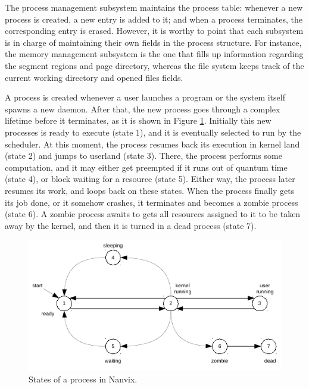 	The process management subsystem maintains the process table:
	whenever a new process is created, a new entry is added to it; and
	when a process terminates, the corresponding entry is erased.
	However, it is worthy to point that each subsystem is in charge of
	maintaining their own fields in the process structure.  For
	instance, the memory management subsystem is the one that fills up
	information regarding the segment regions and page directory,
	whereas the file system keeps track of the current working directory
	and opened files fields.

	A process is created whenever a user launches a program or the
	system itself spawns a new daemon. After that, the new process goes
	through a complex lifetime before it terminates, as it is shown in
	Figure \ref{figure: states of a process in nanvix}.  Initially this
	new processes is ready to execute (state 1), and it is eventually
	selected to run by the scheduler. At this moment, the process
	resumes back its execution in kernel land (state 2) and jumps to
	userland (state 3). There, the process performs some computation,
	and it may either get preempted if it runs out of quantum time
	(state 4), or block waiting for a resource (state 5). Either way,
	the process later resumes its work, and loops back on these states.
	When the process finally gets its job done, or it somehow crashes,
	it terminates and becomes a zombie process (state 6). A zombie
	process awaits to gets all resources assigned to it to be taken away
	by the kernel, and then it is turned in a dead process (state 7).

	\begin{figure}[t]
		\centering
		\includegraphics[scale=1.4]{img/process-states}
		\caption{States of a process in Nanvix.}
		\label{figure: states of a process in nanvix}
	\end{figure}

